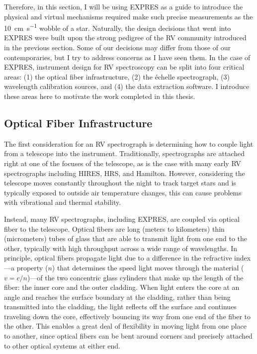 Therefore, in this section, I will be using EXPRES as a guide to introduce the physical and virtual mechanisms required make such precise measurements as the 10~\si{\centi\meter\per\second} wobble of a star. Naturally, the design decisions that went into EXPRES were built upon the strong pedigree of the RV community introduced in the previous section. Some of our decisions may differ from those of our contemporaries, but I try to address concerns as I have seen them. In the case of EXPRES, instrument design for RV spectroscopy can be split into four critical areas: (1) the optical fiber infrastructure, (2) the \'echelle spectrograph, (3) wavelength calibration sources, and (4) the data extraction software. I introduce these areas here to motivate the work completed in this thesis.

\subsection{Optical Fiber Infrastructure} \label{intro:optics:fiber}

The first consideration for an RV spectrograph is determining how to couple light from a telescope into the instrument. Traditionally, spectrographs are attached right at one of the focuses of the telescope, as is the case with many early RV spectrographs including HIRES, HRS, and Hamilton. However, considering the telescope moves constantly throughout the night to track target stars and is typically exposed to outside air temperature changes, this can cause problems with vibrational and thermal stability.

Instead, many RV spectrographs, including EXPRES, are coupled via optical fiber to the telescope. Optical fibers are long (meters to kilometers) thin (micrometers) tubes of glass that are able to transmit light from one end to the other, typically with high throughput across a wide range of wavelengths. In principle, optical fibers propagate light due to a difference in the refractive index---a property ($n$) that determines the speed light moves through the material ($v=c/n$)---of the two concentric glass cylinders that make up the length of the fiber: the inner core and the outer cladding. When light enters the core at an angle and reaches the surface boundary at the cladding, rather than being transmitted into the cladding, the light reflects off the surface and continues traveling down the core, effectively bouncing its way from one end of the fiber to the other. This enables a great deal of flexibility in moving light from one place to another, since optical fibers can be bent around corners and precisely attached to other optical systems at either end.

